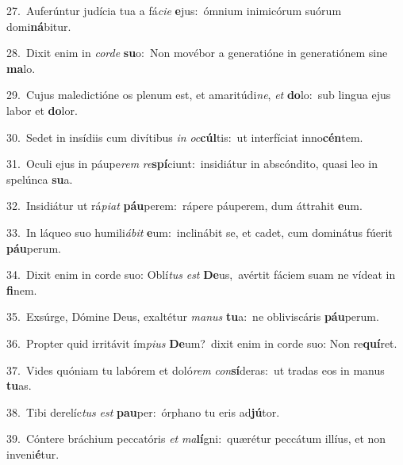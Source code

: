 {\numbfont\textcolor{\numbcolor}{27.}}~Auferúntur judícia tua a fá\-\textit{ci}\-\textit{e} \textbf{e}\-jus:~\star ómnium inimicórum suórum domi\-\textbf{ná}\-bitur.\par
{\numbfont\textcolor{\numbcolor}{28.}}~Dixit enim in \textit{cor}\-\textit{de} \textbf{su}\-o:~\star Non movébor a generatióne in generatiónem sine \textbf{ma}\-lo.\par
{\numbfont\textcolor{\numbcolor}{29.}}~Cujus maledictióne os plenum est, et amaritúdi\-\textit{ne}\-, \textit{et} \textbf{do}\-lo:~\star sub lingua ejus labor et \textbf{do}\-lor.\par
{\numbfont\textcolor{\numbcolor}{30.}}~Sedet in insídiis cum divítibus \textit{in} \textit{oc}\-\textbf{cúl}tis:~\star ut interfíciat inno\-\textbf{cén}\-tem.\par
{\numbfont\textcolor{\numbcolor}{31.}}~Oculi ejus in páupe\textit{rem} \textit{re}\-\textbf{spí}ciunt:~\star insidiátur in abscóndito, quasi leo in spelúnca \textbf{su}\-a.\par
{\numbfont\textcolor{\numbcolor}{32.}}~Insidiátur ut rá\-\textit{pi}\-\textit{at} \textbf{páu}\-perem:~\star rápere páuperem, dum áttrahit \textbf{e}\-um.\par
{\numbfont\textcolor{\numbcolor}{33.}}~In láqueo suo humili\-\textit{á}\-\textit{bit} \textbf{e}\-um:~\star inclinábit se, et cadet, cum dominátus fúerit \textbf{páu}\-perum.\par
{\numbfont\textcolor{\numbcolor}{34.}}~Dixit enim in corde suo: Oblí\textit{tus} \textit{est} \textbf{De}\-us,~\star avértit fáciem suam ne vídeat in \textbf{fi}\-nem.\par
{\numbfont\textcolor{\numbcolor}{35.}}~Exsúrge, Dómine Deus, exaltétur \textit{ma}\-\textit{nus} \textbf{tu}\-a:~\star ne obliviscáris \textbf{páu}\-perum.\par
{\numbfont\textcolor{\numbcolor}{36.}}~Propter quid irritávit ím\-\textit{pi}\-\textit{us} \textbf{De}\-um?~\star dixit enim in corde suo: Non re\-\textbf{quí}\-ret.\par
{\numbfont\textcolor{\numbcolor}{37.}}~Vides quóniam tu labórem et doló\textit{rem} \textit{con}\-\textbf{sí}deras:~\star ut tradas eos in manus \textbf{tu}\-as.\par
{\numbfont\textcolor{\numbcolor}{38.}}~Tibi derelíc\textit{tus} \textit{est} \textbf{pau}\-per:~\star órphano tu eris ad\-\textbf{jú}\-tor.\par
{\numbfont\textcolor{\numbcolor}{39.}}~Cóntere bráchium peccatóris \textit{et} \textit{ma}\-\textbf{lí}gni:~\star quærétur peccátum illíus, et non inveni\-\textbf{é}\-tur.\par
